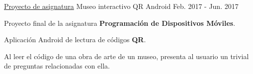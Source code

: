 \begin{cventries}
  \cventry
    {\href{https://github.com/matl1995/PDM/tree/master/Museo}{Proyecto de asignatura}} %
    {Museo interactivo QR} %
    {Android} %
    {Feb. 2017 - Jun. 2017} %
    {
      \begin{cvitems} %
        \item {Proyecto final de la asignatura \textbf{Programación de Dispositivos Móviles}.}
        \item {Aplicación Android de lectura de códigos \textbf{QR}.}
        \item {Al leer el código de una obra de arte de un museo, presenta al usuario un trivial de preguntas relacionadas con ella.}
      \end{cvitems}
    }

\end{cventries}
